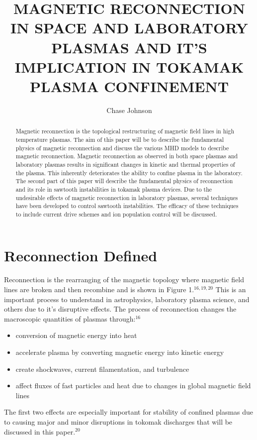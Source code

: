 \documentclass{article}
\begin{document}
\title{MAGNETIC RECONNECTION IN SPACE AND LABORATORY PLASMAS AND IT’S IMPLICATION IN TOKAMAK PLASMA CONFINEMENT}
\author{Chase Johnson}
\maketitle
\begin{abstract}
Magnetic reconnection is the topological restructuring of magnetic field lines in high temperature plasmas.    The aim of this paper will be to describe the fundamental physics of magnetic reconnection and discuss the various MHD models to describe magnetic reconnection.  Magnetic reconnection as observed in both space plasmas and laboratory plasmas results in significant changes in kinetic and thermal properties of the plasma.  This inherently deteriorates the ability to confine plasma in the laboratory.  The second part of this paper will describe the fundamental physics of reconnection and its role in sawtooth instabilities in tokamak plasma devices.  Due to the undesirable effects of magnetic reconnection in laboratory plasmas, several techniques have been developed to control sawtooth instabilities.  The efficacy of these techniques to include current drive schemes and ion population control will be discussed.
\end{abstract}
\section{Reconnection Defined}
Reconnection is the rearranging of the magnetic topology where magnetic field lines are broken and then recombine and is shown in Figure 1.$^{16,19,20}$  This is an important process to understand in astrophysics, laboratory plasma science, and others due to it's disruptive effects.  The process of reconnection changes the macroscopic quantities of plasmas through:$^{16}$
\begin{itemize}
\item conversion of magnetic energy into heat
\item accelerate plasma by converting magnetic energy into kinetic energy
\item create shockwaves, current filamentation, and turbulence
\item affect fluxes of fast particles and heat due to changes in global magnetic field lines
\end{itemize}
The first two effects are especially important for stability of confined plasmas due to causing major and minor disruptions in tokomak discharges that will be discussed in this paper.$^{20}$
\begin{SCfigure}
  \centering
\end{SCfigure}
\end{document}
